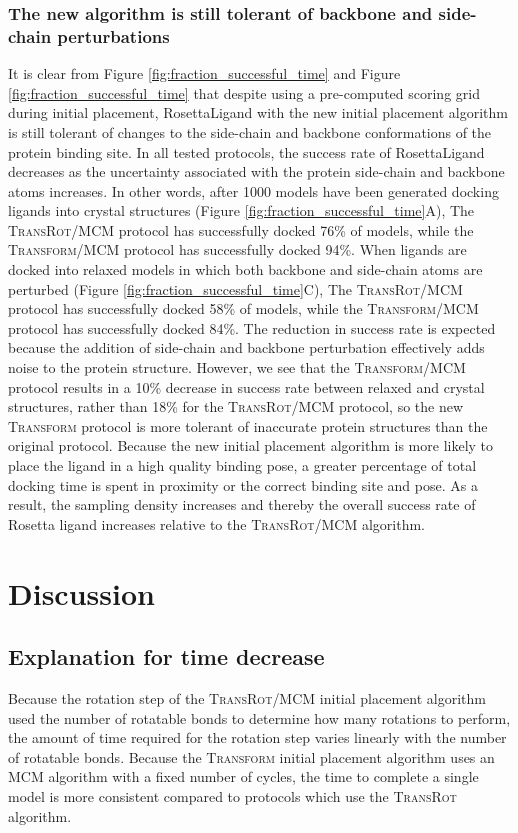 \subsubsection{The new algorithm is still tolerant of backbone and side-chain perturbations}
It is clear from Figure \ref{fig:fraction_successful_time} and Figure \ref{fig:fraction_successful_time} that despite using a pre-computed scoring grid during initial placement, RosettaLigand with the new initial placement algorithm is still tolerant of changes to the side-chain and backbone conformations of the protein binding site. In all tested protocols, the success rate of RosettaLigand decreases as the uncertainty associated with the protein side-chain and backbone atoms increases.
In other words, after 1000 models have been generated docking ligands into crystal structures (Figure \ref{fig:fraction_successful_time}A), The \textsc{TransRot}/MCM protocol has successfully docked 76\% of models, while the \textsc{Transform}/MCM protocol has successfully docked 94\%.
When ligands are docked into relaxed models in which both backbone and side-chain atoms are perturbed (Figure \ref{fig:fraction_successful_time}C), The \textsc{TransRot}/MCM protocol has successfully docked 58\% of models, while the \textsc{Transform}/MCM protocol has successfully docked 84\%.
The reduction in success rate is expected because the addition of side-chain and backbone perturbation effectively adds noise to the protein structure.
However, we see that the \textsc{Transform}/MCM protocol results in a 10\% decrease in success rate between relaxed and crystal structures, rather than 18\% for the \textsc{TransRot}/MCM protocol, so the new \textsc{Transform} protocol is more tolerant of inaccurate protein structures than the original protocol.
Because the new initial placement algorithm is more likely to place the ligand in a high quality binding pose, a greater percentage of total docking time is spent in proximity or the correct binding site and pose.
As a result, the sampling density increases and thereby the overall success rate of Rosetta ligand increases relative to the \textsc{TransRot}/MCM algorithm.

\section{Discussion}

\subsection{Explanation for time decrease}
Because the rotation step of the \textsc{TransRot}/MCM initial placement algorithm used the number of rotatable bonds to determine how many rotations to perform, the amount of time required for the rotation step varies linearly with the number of rotatable bonds.
Because the \textsc{Transform} initial placement algorithm uses an MCM algorithm with a fixed number of cycles, the time to complete a single model is more consistent compared to protocols which use the \textsc{TransRot} algorithm.  

